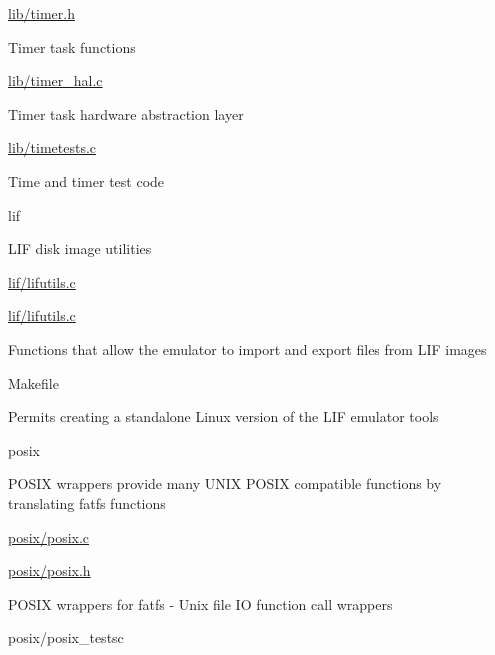 {\begin{DoxyItemize}
\begin{DoxyItemize}
\item \hyperlink{timer_8h}{lib/timer.\+h}
\begin{DoxyItemize}
\item Timer task functions
\end{DoxyItemize}
\item \hyperlink{timer__hal_8c}{lib/timer\+\_\+hal.\+c}
\begin{DoxyItemize}
\item Timer task hardware abstraction layer
\end{DoxyItemize}
\item \hyperlink{timetests_8c}{lib/timetests.\+c}
\begin{DoxyItemize}
\item Time and timer test code
\end{DoxyItemize}
\end{DoxyItemize}
\item lif
\begin{DoxyItemize}
\item L\+IF disk image utilities
\item \hyperlink{lifutils_8c}{lif/lifutils.\+c}
\item \hyperlink{lifutils_8c}{lif/lifutils.\+c}
\begin{DoxyItemize}
\item Functions that allow the emulator to import and export files from L\+IF images
\end{DoxyItemize}
\item Makefile
\begin{DoxyItemize}
\item Permits creating a standalone Linux version of the L\+IF emulator tools
\end{DoxyItemize}
\end{DoxyItemize}
\item posix
\begin{DoxyItemize}
\item P\+O\+S\+IX wrappers provide many U\+N\+IX P\+O\+S\+IX compatible functions by translating fatfs functions
\item \hyperlink{posix_8c}{posix/posix.\+c}
\item \hyperlink{posix_8h}{posix/posix.\+h}
\begin{DoxyItemize}
\item P\+O\+S\+IX wrappers for fatfs -\/ Unix file IO function call wrappers
\end{DoxyItemize}
\item posix/posix\+\_\+testsc
\begin{DoxyItemize}

\end{DoxyItemize}
\end{DoxyItemize}
\end{DoxyItemize}}
